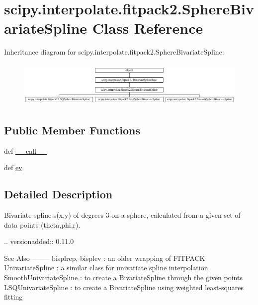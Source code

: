 \hypertarget{classscipy_1_1interpolate_1_1fitpack2_1_1SphereBivariateSpline}{}\section{scipy.\+interpolate.\+fitpack2.\+Sphere\+Bivariate\+Spline Class Reference}
\label{classscipy_1_1interpolate_1_1fitpack2_1_1SphereBivariateSpline}
Inheritance diagram for scipy.\+interpolate.\+fitpack2.\+Sphere\+Bivariate\+Spline\+:\begin{figure}[H]
\begin{center}
\leavevmode
\includegraphics[height=2.248996cm]{classscipy_1_1interpolate_1_1fitpack2_1_1SphereBivariateSpline}
\end{center}
\end{figure}
\subsection*{Public Member Functions}
\begin{DoxyCompactItemize}
\item 
def \hyperlink{classscipy_1_1interpolate_1_1fitpack2_1_1SphereBivariateSpline_a88f617f0917682fc0c9eaeacf7441831}{\+\_\+\+\_\+call\+\_\+\+\_\+}
\item 
def \hyperlink{classscipy_1_1interpolate_1_1fitpack2_1_1SphereBivariateSpline_a85d3a95b64c8677e34d74138b52374f5}{ev}
\end{DoxyCompactItemize}


\subsection{Detailed Description}
\begin{DoxyVerb}Bivariate spline s(x,y) of degrees 3 on a sphere, calculated from a
given set of data points (theta,phi,r).

.. versionadded:: 0.11.0

See Also
--------
bisplrep, bisplev : an older wrapping of FITPACK
UnivariateSpline : a similar class for univariate spline interpolation
SmoothUnivariateSpline :
    to create a BivariateSpline through the given points
LSQUnivariateSpline :
    to create a BivariateSpline using weighted least-squares fitting
\end{DoxyVerb}
 

